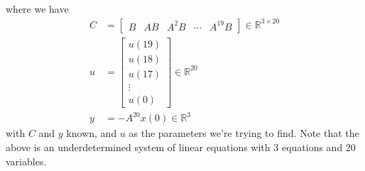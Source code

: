\documentclass[12pt]{exam}
\begin{document}
\begin{questions}
\begin{solution}
\begin{enumerate}[label=(\alph*)]
      where we have
      \begin{align*}
        C &=
          \begin{bmatrix}
            B & AB & A^2B & \cdots & A^{19}B
          \end{bmatrix} \in \mathbb{R}^{3 \times 20} \\
        u &= 
          \begin{bmatrix}
            u(19) \\
            u(18) \\
            u(17) \\
            \vdots \\
            u(0)
          \end{bmatrix} \in \mathbb{R}^{20}\\
        y &= -A^{20}x(0) \in \mathbb{R}^{3}
      \end{align*}
      with $C$ and $y$ known, and $u$ as the parameters we're trying to find. Note that the above is an underdetermined system of linear equations with 3 equations and 20 variables.


\end{enumerate}
\end{solution}
\end{questions}
\end{document}
